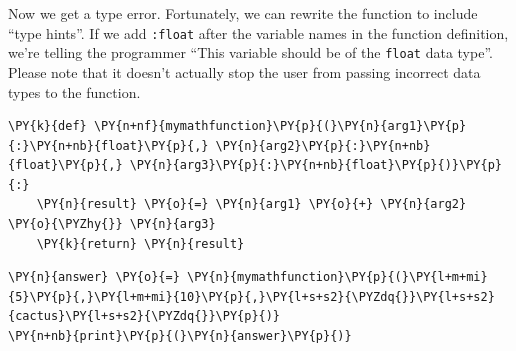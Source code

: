    Now we get a type error. Fortunately, we can rewrite the function to
include ``type hints''. If we add \texttt{:float} after the variable
names in the function definition, we're telling the programmer ``This
variable should be of the \texttt{float} data type''. Please note that
it doesn't actually stop the user from passing incorrect data types to
the function.

    \begin{tcolorbox}[breakable, size=fbox, boxrule=1pt, pad at break*=1mm,colback=cellbackground, colframe=cellborder]
\begin{Verbatim}[commandchars=\\\{\}]
\PY{k}{def} \PY{n+nf}{mymathfunction}\PY{p}{(}\PY{n}{arg1}\PY{p}{:}\PY{n+nb}{float}\PY{p}{,} \PY{n}{arg2}\PY{p}{:}\PY{n+nb}{float}\PY{p}{,} \PY{n}{arg3}\PY{p}{:}\PY{n+nb}{float}\PY{p}{)}\PY{p}{:}
    \PY{n}{result} \PY{o}{=} \PY{n}{arg1} \PY{o}{+} \PY{n}{arg2} \PY{o}{\PYZhy{}} \PY{n}{arg3}
    \PY{k}{return} \PY{n}{result}
\end{Verbatim}
\end{tcolorbox}

    \begin{tcolorbox}[breakable, size=fbox, boxrule=1pt, pad at break*=1mm,colback=cellbackground, colframe=cellborder]
\begin{Verbatim}[commandchars=\\\{\}]
\PY{n}{answer} \PY{o}{=} \PY{n}{mymathfunction}\PY{p}{(}\PY{l+m+mi}{5}\PY{p}{,}\PY{l+m+mi}{10}\PY{p}{,}\PY{l+s+s2}{\PYZdq{}}\PY{l+s+s2}{cactus}\PY{l+s+s2}{\PYZdq{}}\PY{p}{)}
\PY{n+nb}{print}\PY{p}{(}\PY{n}{answer}\PY{p}{)}
\end{Verbatim}
\end{tcolorbox}

